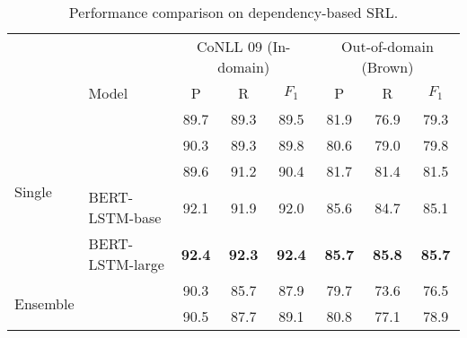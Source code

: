 \documentclass[11pt,a4paper]{article}
\begin{document}
\begin{table*}[t]
	\centering
	\small
	\begin{tabular}{ll ccc ccc}
		\toprule
		&  & \multicolumn{3}{c}{CoNLL 09 (In-domain)} &  \multicolumn{3}{c}{Out-of-domain (Brown)} \\ 
		\cmidrule(lr){3-5} \cmidrule(lr){6-8}
		&Model  & P & R & $F_1$ & P & R & $F_1$ \\
		\midrule
		\multirow{5}{*}{Single} & \citet{he2018syntax}  & 89.7 & 89.3 & 89.5 & 81.9 & 76.9 & 79.3 \\
		&   \citet{li2018unified} & 90.3 & 89.3 & 89.8 & 80.6 & 79.0 & 79.8 \\
		&	\citet{li2019dependency}  & 89.6 & 91.2 & 90.4 & 81.7 & 81.4 & 81.5 \\  \cmidrule{2-8}
		& BERT-LSTM-base & 92.1 & 91.9 & 92.0 & 85.6 & 84.7 & 85.1 \\
		& BERT-LSTM-large & \textbf{92.4} & \textbf{92.3} & \textbf{92.4} & \textbf{85.7} & \textbf{85.8 } & \textbf{85.7} \\
		\midrule
		
		\multirow{2}{*}{Ensemble} &	\citet{roth2016neural}  &90.3 & 85.7 & 87.9 & 79.7 & 73.6 & 76.5 \\
		&	\citet{marcheggiani2017encoding}  & 90.5 & 87.7 & 89.1 & 80.8 & 77.1 & 78.9 \\ 
		\bottomrule
	\end{tabular}
	\caption{Performance comparison on dependency-based SRL.\label{res:conll09}}
\end{table*}
\end{document}
